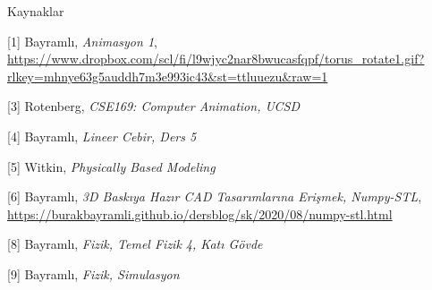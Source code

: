 \documentclass[12pt,fleqn]{article}\usepackage{../../common}
\begin{document}
Kaynaklar

[1] Bayramlı, {\em Animasyon 1},
    \url{https://www.dropbox.com/scl/fi/l9wjyc2nar8bwucasfqpf/torus_rotate1.gif?rlkey=mhnye63g5auddh7m3e993ic43&st=ttluuezu&raw=1}

[3] Rotenberg, {\em CSE169: Computer Animation, UCSD}

[4] Bayramlı, {\em Lineer Cebir, Ders 5}

[5] Witkin, {\em Physically Based Modeling}

[6] Bayramlı, {\em 3D Baskıya Hazır CAD Tasarımlarına Erişmek, Numpy-STL},
    \url{https://burakbayramli.github.io/dersblog/sk/2020/08/numpy-stl.html}

[8] Bayramlı, {\em Fizik, Temel Fizik 4, Katı Gövde}

[9] Bayramlı, {\em Fizik, Simulasyon}
\end{document}
